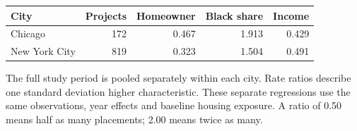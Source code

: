 \begin{center}\begin{tabular}{lrrrr}\hline
City & Projects & Homeowner & Black share & Income \\ \hline
Chicago & 172 & 0.467 & 1.913 & 0.429 \\
New York City & 819 & 0.323 & 1.504 & 0.491 \\
\hline\end{tabular}\end{center}
The full study period is pooled separately within each city. Rate ratios describe one standard deviation higher characteristic. These separate regressions use the same observations, year effects and baseline housing exposure. A ratio of 0.50 means half as many placements; 2.00 means twice as many.\par
